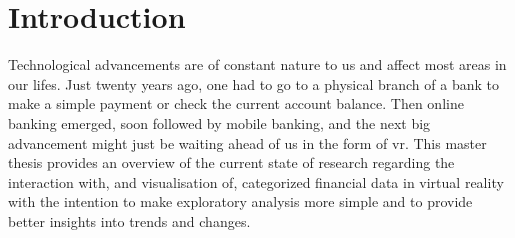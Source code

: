 
\chapter{Introduction} %

\label{ChapterIntroduction}

Technological advancements are of constant nature to us and affect most areas in our lifes. Just twenty years ago, one had to go to a physical branch of a bank to make a simple payment or check the current account balance. Then online banking emerged, soon followed by mobile banking, and the next big advancement might just be waiting ahead of us in the form of \gls{vr}. This master thesis provides an overview of the current state of research regarding the interaction with, and visualisation of, categorized financial data in virtual reality with the intention to make exploratory analysis more simple and to provide better insights into trends and changes.

